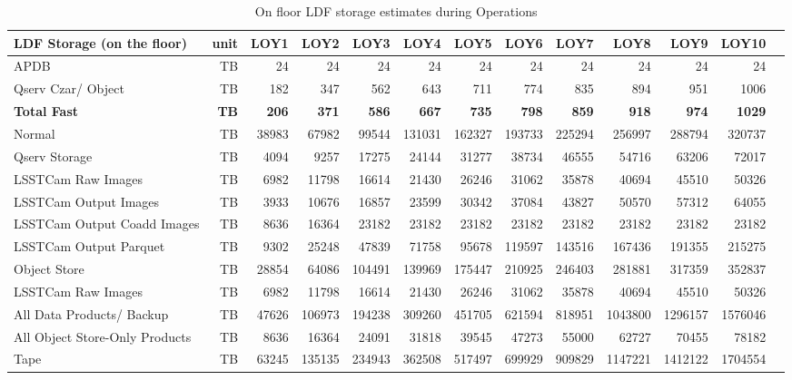 \tiny \begin{longtable} { |p{}  |r  |r  |r  |r  |r  |r  |r  |r  |r  |r  |r  |r |} 
\caption{On floor LDF storage estimates during Operations
 \label{tab:storageFloorOps}}\\ 
\hline 
\textbf{LDF Storage (on the floor)}&\textbf{unit}&\textbf{LOY1}&\textbf{LOY2}&\textbf{LOY3}&\textbf{LOY4}&\textbf{LOY5}&\textbf{LOY6}&\textbf{LOY7}&\textbf{LOY8}&\textbf{LOY9}&\textbf{LOY10} \\ \hline
{APDB}&{TB}&{24}&{24}&{24}&{24}&{24}&{24}&{24}&{24}&{24}&{24} \\ \hline
{Qserv Czar/ Object}&{TB}&{182}&{347}&{562}&{643}&{711}&{774}&{835}&{894}&{951}&{1006} \\ \hline
\textbf{Total Fast}&\textbf{TB}&\textbf{206}&\textbf{371}&\textbf{586}&\textbf{667}&\textbf{735}&\textbf{798}&\textbf{859}&\textbf{918}&\textbf{974}&\textbf{1029} \\ \hline
{Normal}&{TB}&{38983}&{67982}&{99544}&{131031}&{162327}&{193733}&{225294}&{256997}&{288794}&{320737} \\ \hline
{Qserv Storage}&{TB}&{4094}&{9257}&{17275}&{24144}&{31277}&{38734}&{46555}&{54716}&{63206}&{72017} \\ \hline
{LSSTCam Raw Images}&{TB}&{6982}&{11798}&{16614}&{21430}&{26246}&{31062}&{35878}&{40694}&{45510}&{50326} \\ \hline
{LSSTCam Output Images}&{TB}&{3933}&{10676}&{16857}&{23599}&{30342}&{37084}&{43827}&{50570}&{57312}&{64055} \\ \hline
{LSSTCam Output Coadd Images}&{TB}&{8636}&{16364}&{23182}&{23182}&{23182}&{23182}&{23182}&{23182}&{23182}&{23182} \\ \hline
{LSSTCam Output Parquet}&{TB}&{9302}&{25248}&{47839}&{71758}&{95678}&{119597}&{143516}&{167436}&{191355}&{215275} \\ \hline
{Object Store}&{TB}&{28854}&{64086}&{104491}&{139969}&{175447}&{210925}&{246403}&{281881}&{317359}&{352837} \\ \hline
{LSSTCam Raw Images}&{TB}&{6982}&{11798}&{16614}&{21430}&{26246}&{31062}&{35878}&{40694}&{45510}&{50326} \\ \hline
{All Data Products/ Backup}&{TB}&{47626}&{106973}&{194238}&{309260}&{451705}&{621594}&{818951}&{1043800}&{1296157}&{1576046} \\ \hline
{All Object Store-Only Products}&{TB}&{8636}&{16364}&{24091}&{31818}&{39545}&{47273}&{55000}&{62727}&{70455}&{78182} \\ \hline
{Tape}&{TB}&{63245}&{135135}&{234943}&{362508}&{517497}&{699929}&{909829}&{1147221}&{1412122}&{1704554} \\ \hline
\end{longtable} \normalsize
